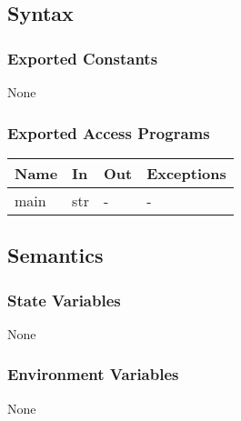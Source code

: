 \documentclass[12pt, titlepage]{article}
\begin{document}
\subsection{Syntax}

\subsubsection{Exported Constants}
None

\subsubsection{Exported Access Programs}

\begin{center}
\begin{tabular}{p{2cm} p{4cm} p{4cm} p{2cm}}
\hline
\textbf{Name} & \textbf{In} & \textbf{Out} & \textbf{Exceptions} \\
\hline
main & str& - & - \\
\hline
\end{tabular}
\end{center}

\subsection{Semantics}

\subsubsection{State Variables}

None

\subsubsection{Environment Variables}

None
\end{document}
